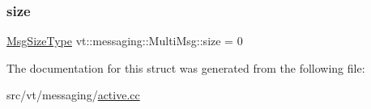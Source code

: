 \mbox{\label{structvt_1_1messaging_1_1_multi_msg_a05e791d373d9a5c0eb54c55a32af7cb9}} 
\subsubsection{\texorpdfstring{size}{size}}
{\footnotesize\ttfamily \hyperlink{namespacevt_a408e86a8c7c89309b52907dc5a513924}{Msg\+Size\+Type} vt\+::messaging\+::\+Multi\+Msg\+::size = 0\hspace{0.3cm}{\ttfamily [private]}}



The documentation for this struct was generated from the following file\+:\begin{DoxyCompactItemize}
\item 
src/vt/messaging/\hyperlink{active_8cc}{active.\+cc}\end{DoxyCompactItemize}
